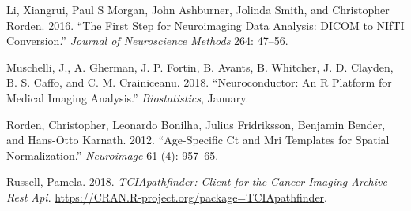 \documentclass[]{elsarticle} %
\begin{document}
\leavevmode\hypertarget{ref-dcm2niix}{}%
Li, Xiangrui, Paul S Morgan, John Ashburner, Jolinda Smith, and
Christopher Rorden. 2016. ``The First Step for Neuroimaging Data
Analysis: DICOM to NIfTI Conversion.'' \emph{Journal of Neuroscience
Methods} 264: 47--56.

\leavevmode\hypertarget{ref-neuroconductor}{}%
Muschelli, J., A. Gherman, J. P. Fortin, B. Avants, B. Whitcher, J. D.
Clayden, B. S. Caffo, and C. M. Crainiceanu. 2018. ``Neuroconductor: An
R Platform for Medical Imaging Analysis.'' \emph{Biostatistics},
January.

\leavevmode\hypertarget{ref-rorden2012age}{}%
Rorden, Christopher, Leonardo Bonilha, Julius Fridriksson, Benjamin
Bender, and Hans-Otto Karnath. 2012. ``Age-Specific Ct and Mri Templates
for Spatial Normalization.'' \emph{Neuroimage} 61 (4): 957--65.

\leavevmode\hypertarget{ref-TCIApathfinder}{}%
Russell, Pamela. 2018. \emph{TCIApathfinder: Client for the Cancer
Imaging Archive Rest Api}.
\url{https://CRAN.R-project.org/package=TCIApathfinder}.
\end{document}
